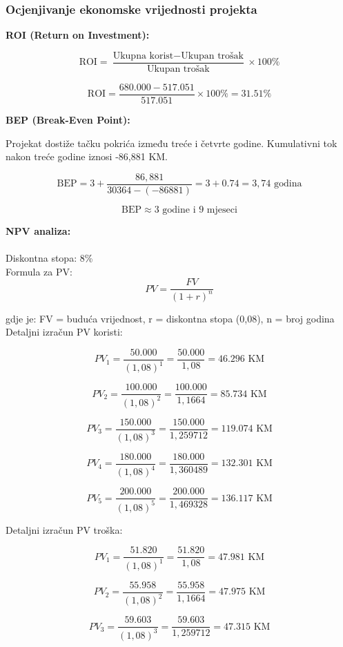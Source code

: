 \documentclass{article}
\begin{document}
\subsubsection{Ocjenjivanje ekonomske vrijednosti projekta}

\textbf{ROI (Return on Investment):}

$$\text{ROI} = \frac{\text{Ukupna korist} - \text{Ukupan trošak}}{\text{Ukupan trošak}} \times 100\%$$

$$\text{ROI} = \frac{680.000 - 517.051}{517.051} \times 100\% = 31.51\%$$

\noindent
\textbf{BEP (Break-Even Point):}

\noindent
Projekat dostiže tačku pokrića između treće i četvrte godine. Kumulativni tok nakon treće godine iznosi -86,881 KM.

$$\text{BEP} = 3 + \frac{86,881}{30364 - (-86881)} = 3 + 0.74 = 3,74 \text{ godina}$$

$$\text{BEP} \approx 3 \text{ godine i } 9 \text{ mjeseci}$$

\noindent
\textbf{NPV analiza:} \\ \\
Diskontna stopa: 8\% \\
Formula za PV:
$$PV = \frac{FV}{(1 + r)^n}$$

\noindent
gdje je: FV = buduća vrijednost, r = diskontna stopa (0,08), n = broj godina\\

\noindent
Detaljni izračun PV koristi:

$$PV_1 = \frac{50.000}{(1,08)^1} = \frac{50.000}{1,08} = 46.296 \text{ KM}$$

$$PV_2 = \frac{100.000}{(1,08)^2} = \frac{100.000}{1,1664} = 85.734 \text{ KM}$$

$$PV_3 = \frac{150.000}{(1,08)^3} = \frac{150.000}{1,259712} = 119.074 \text{ KM}$$

$$PV_4 = \frac{180.000}{(1,08)^4} = \frac{180.000}{1,360489} = 132.301 \text{ KM}$$

$$PV_5 = \frac{200.000}{(1,08)^5} = \frac{200.000}{1,469328} = 136.117 \text{ KM}$$

\noindent
Detaljni izračun PV troška:

$$PV_1 = \frac{51.820}{(1,08)^1} = \frac{51.820}{1,08} = 47.981 \text{ KM}$$

$$PV_2 = \frac{55.958}{(1,08)^2} = \frac{55.958}{1,1664} = 47.975 \text{ KM}$$

$$PV_3 = \frac{59.603}{(1,08)^3} = \frac{59.603}{1,259712} = 47.315 \text{ KM}$$
\end{document}
